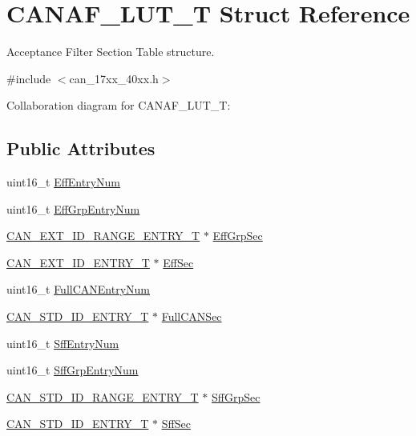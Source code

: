 \hypertarget{structCANAF__LUT__T}{}\section{C\+A\+N\+A\+F\+\_\+\+L\+U\+T\+\_\+T Struct Reference}
\label{structCANAF__LUT__T}


Acceptance Filter Section Table structure.  




{\ttfamily \#include $<$can\+\_\+17xx\+\_\+40xx.\+h$>$}



Collaboration diagram for C\+A\+N\+A\+F\+\_\+\+L\+U\+T\+\_\+T\+:
\subsection*{Public Attributes}
\begin{DoxyCompactItemize}
\item 
uint16\+\_\+t \hyperlink{structCANAF__LUT__T_a62d74093f87bfd355f53f143b022e3ce}{Eff\+Entry\+Num}
\item 
uint16\+\_\+t \hyperlink{structCANAF__LUT__T_a48493bdab0f7818be7082e61284994d8}{Eff\+Grp\+Entry\+Num}
\item 
\hyperlink{structCAN__EXT__ID__RANGE__ENTRY__T}{C\+A\+N\+\_\+\+E\+X\+T\+\_\+\+I\+D\+\_\+\+R\+A\+N\+G\+E\+\_\+\+E\+N\+T\+R\+Y\+\_\+T} $\ast$ \hyperlink{structCANAF__LUT__T_a62a98cfd049ea67dd3b01d6e6f3871d5}{Eff\+Grp\+Sec}
\item 
\hyperlink{structCAN__EXT__ID__ENTRY__T}{C\+A\+N\+\_\+\+E\+X\+T\+\_\+\+I\+D\+\_\+\+E\+N\+T\+R\+Y\+\_\+T} $\ast$ \hyperlink{structCANAF__LUT__T_a30b5814a21e36ca7d9711c0752ff3f4e}{Eff\+Sec}
\item 
uint16\+\_\+t \hyperlink{structCANAF__LUT__T_ac8dfb97883a903ee82362da9abd4e863}{Full\+C\+A\+N\+Entry\+Num}
\item 
\hyperlink{structCAN__STD__ID__ENTRY__T}{C\+A\+N\+\_\+\+S\+T\+D\+\_\+\+I\+D\+\_\+\+E\+N\+T\+R\+Y\+\_\+T} $\ast$ \hyperlink{structCANAF__LUT__T_a7faf17c00ee110a91d7339aacd4fda41}{Full\+C\+A\+N\+Sec}
\item 
uint16\+\_\+t \hyperlink{structCANAF__LUT__T_aa5b3264e0fb44bbb7f3bf16ee367cc2e}{Sff\+Entry\+Num}
\item 
uint16\+\_\+t \hyperlink{structCANAF__LUT__T_ae7d8ed9ef4c6d5b4bef0be1068ea0c8d}{Sff\+Grp\+Entry\+Num}
\item 
\hyperlink{structCAN__STD__ID__RANGE__ENTRY__T}{C\+A\+N\+\_\+\+S\+T\+D\+\_\+\+I\+D\+\_\+\+R\+A\+N\+G\+E\+\_\+\+E\+N\+T\+R\+Y\+\_\+T} $\ast$ \hyperlink{structCANAF__LUT__T_abcfa9b72b2a981e655551810d52c5fff}{Sff\+Grp\+Sec}
\item 
\hyperlink{structCAN__STD__ID__ENTRY__T}{C\+A\+N\+\_\+\+S\+T\+D\+\_\+\+I\+D\+\_\+\+E\+N\+T\+R\+Y\+\_\+T} $\ast$ \hyperlink{structCANAF__LUT__T_a34daf657f3d2a50e721daa0ab7dee994}{Sff\+Sec}
\end{DoxyCompactItemize}


